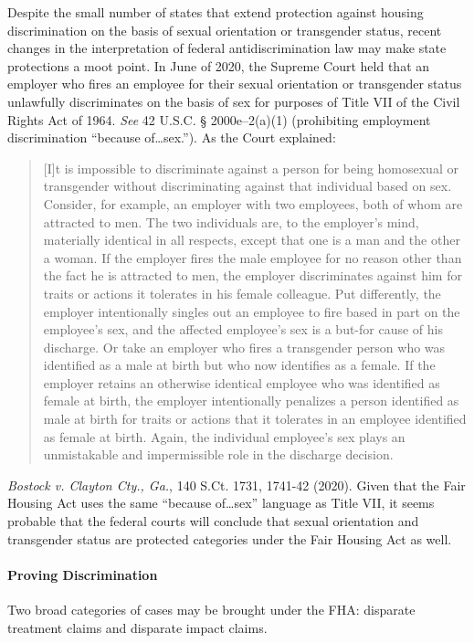 Despite the small number of states that extend protection against housing
discrimination on the basis of sexual orientation or transgender status, recent
changes in the interpretation of federal antidiscrimination law may make state
protections a moot point. In June of 2020, the Supreme Court held that an
employer who fires an employee for their sexual orientation or transgender
status unlawfully discriminates on the basis of sex for purposes of Title VII
of the Civil Rights Act of 1964. \textit{See} 42 U.S.C. {\S} 2000e--2(a)(1)
(prohibiting employment discrimination ``because of\dots sex.''). As the
Court explained:
\begin{quote}
[I]t is impossible to discriminate against a person for being homosexual or
transgender without discriminating against that individual based on sex.
Consider, for example, an employer with two employees, both of whom are
attracted to men. The two individuals are, to the employer's mind, materially
identical in all respects, except that one is a man and the other a woman. If
the employer fires the male employee for no reason other than the fact he is
attracted to men, the employer discriminates against him for traits or actions
it tolerates in his female colleague. Put differently, the employer
intentionally singles out an employee to fire based in part on the employee's
sex, and the affected employee's sex is a but-for cause of his discharge. Or
take an employer who fires a transgender person who was identified as a male at
birth but who now identifies as a female. If the employer retains an otherwise
identical employee who was identified as female at birth, the employer
intentionally penalizes a person identified as male at birth for traits or
actions that it tolerates in an employee identified as female at birth. Again,
the individual employee's sex plays an unmistakable and impermissible role in
the discharge decision.
\end{quote}
\emph{Bostock v. Clayton Cty., Ga.}, 140 S.Ct. 1731, 1741-42 (2020). Given that
the Fair Housing Act uses the same ``because of\dots sex'' language as Title
VII, it seems probable that the federal courts will conclude that sexual
orientation and transgender status are protected categories under the Fair
Housing Act as well. 

\paragraph{Proving Discrimination}

Two broad categories of cases may be brought under the FHA: disparate treatment
claims and disparate impact claims.  

